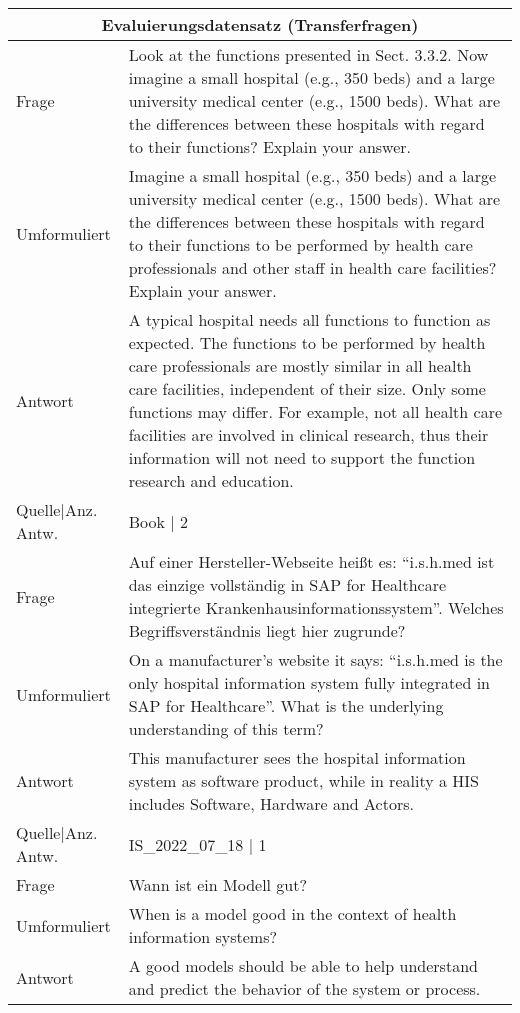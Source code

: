 {\begin{landscape}
    \begin{longtable}{p{3cm}p{}}
    \toprule
    \multicolumn{2}{c}{\textbf{Evaluierungsdatensatz (Transferfragen)}}\\
    \midrule
    Frage & Look at the functions presented in Sect. 3.3.2. Now imagine a small hospital (e.g., 350 beds) and a large university medical center (e.g., 1500 beds). What are the differences between these hospitals with regard to their functions? Explain your answer.\\
    Umformuliert & Imagine a small hospital (e.g., 350 beds) and a large university medical center (e.g., 1500 beds). What are the differences between these hospitals with regard to their functions to be performed by health care professionals and other staff in health care facilities? Explain your answer.\\
    Antwort & A typical hospital needs all functions to function as expected.
    The functions to be performed by health care professionals are mostly similar in all health care facilities, independent of their size.
    Only some functions may differ.
    For example, not all health care facilities are involved in clinical research, thus their information will not need to support the function research and education.\\
    Quelle|Anz. Antw. &  Book  | 2 \\
    \midrule
    Frage & Auf einer Hersteller-Webseite heißt es: ``i.s.h.med ist das einzige vollständig in SAP for Healthcare integrierte Krankenhausinformationssystem''. Welches Begriffsverständnis liegt hier zugrunde? \\
    Umformuliert & On a manufacturer's website it says: ``i.s.h.med is the only hospital information system fully integrated in SAP for Healthcare''. What is the underlying understanding of this term? \\
    Antwort & This manufacturer sees the hospital information system as software product, while in reality a HIS includes Software, Hardware and Actors.\\
    Quelle|Anz. Antw. &  IS\_2022\_07\_18  | 1 \\
    \midrule
    Frage & Wann ist ein Modell gut? \\
    Umformuliert & When is a model good in the context of health information systems? \\
    Antwort & A good models should be able to help understand and predict the behavior of the system or process.

\end{longtable}
\end{landscape}}
